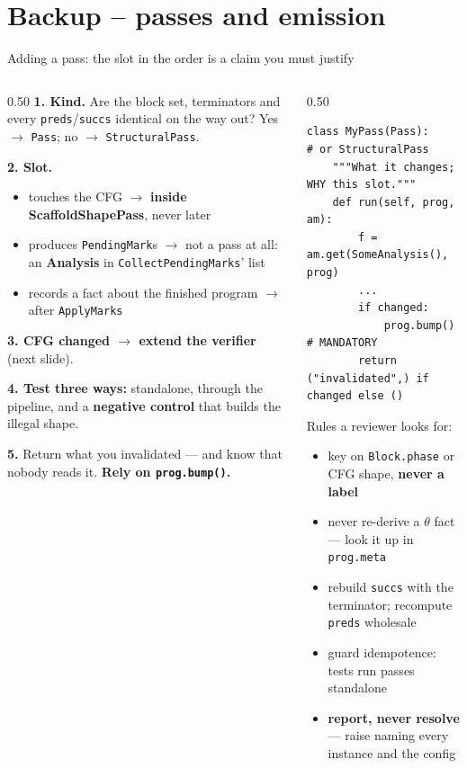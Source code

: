 \documentclass[aspectratio=169,9pt]{beamer}
\newcommand{\key}[1]{\textcolor{acc}{\textbf{#1}}}
\newcommand{\bad}[1]{\textcolor{warn}{\textbf{#1}}}
\newcommand{\good}[1]{\textcolor{ok}{\textbf{#1}}}
\begin{document}
\section{Backup -- passes and emission}
\begin{frame}[fragile]{Adding a pass: the slot in the order is a claim you must justify}
\begin{columns}[T]
\begin{column}{0.50\textwidth}
\scriptsize
\textbf{1. Kind.} Are the block set, terminators and every
\texttt{preds}/\texttt{succs} identical on the way out? Yes $\to$ \texttt{Pass};
no $\to$ \texttt{StructuralPass}.

\textbf{2. Slot.}
\begin{itemize}\itemsep1pt
  \item touches the CFG $\to$ \key{inside ScaffoldShapePass}, never later
  \item produces \texttt{PendingMark}s $\to$ not a pass at all: an \key{Analysis} in
        \texttt{CollectPendingMarks}' list
  \item records a fact about the finished program $\to$ after \texttt{ApplyMarks}
\end{itemize}

\textbf{3. CFG changed $\to$ extend the verifier} (next slide).

\textbf{4. Test three ways:} standalone, through the pipeline, and a
\good{negative control} that builds the illegal shape.

\textbf{5.} Return what you invalidated --- and know that nobody reads it.
\bad{Rely on \texttt{prog.bump()}.}
\end{column}
\begin{column}{0.50\textwidth}
\begin{lstlisting}[style=py]
class MyPass(Pass):          # or StructuralPass
    """What it changes; WHY this slot."""
    def run(self, prog, am):
        f = am.get(SomeAnalysis(), prog)
        ...
        if changed:
            prog.bump()      # MANDATORY
        return ("invalidated",) if changed else ()
\end{lstlisting}
\scriptsize
Rules a reviewer looks for:
\begin{itemize}\itemsep1pt
  \item key on \texttt{Block.phase} or CFG shape, \bad{never a label}
  \item never re-derive a $\theta$ fact --- look it up in \texttt{prog.meta}
  \item rebuild \texttt{succs} with the terminator; recompute \texttt{preds} wholesale
  \item guard idempotence: tests run passes standalone
  \item \key{report, never resolve} --- raise naming every instance and the config
\end{itemize}
\end{column}
\end{columns}
\end{frame}
\end{document}
